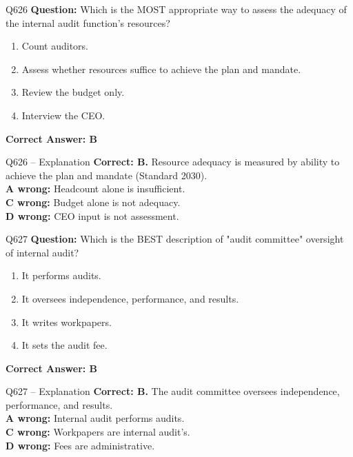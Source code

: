 \documentclass[aspectratio=169,10pt]{beamer}
\begin{document}
	\begin{frame}[t]{Q626}
		\small
		\textbf{Question:} Which is the MOST appropriate way to assess the adequacy of the internal audit function's resources?
		\begin{enumerate}[label=\Alph*.,itemsep=1pt,topsep=2pt]
			\item Count auditors.
			\item Assess whether resources suffice to achieve the plan and mandate.
			\item Review the budget only.
			\item Interview the CEO.
		\end{enumerate}
		\vspace{4pt}
		\textbf{Correct Answer: B}
	\end{frame}
	
	\begin{frame}[t]{Q626 -- Explanation}
		\small
		\textbf{Correct: B.} Resource adequacy is measured by ability to achieve the plan and mandate (Standard 2030). \\[4pt]
		\textbf{A wrong:} Headcount alone is insufficient. \\[2pt]
		\textbf{C wrong:} Budget alone is not adequacy. \\[2pt]
		\textbf{D wrong:} CEO input is not assessment.
	\end{frame}
	
	\begin{frame}[t]{Q627}
		\small
		\textbf{Question:} Which is the BEST description of "audit committee" oversight of internal audit?
		\begin{enumerate}[label=\Alph*.,itemsep=1pt,topsep=2pt]
			\item It performs audits.
			\item It oversees independence, performance, and results.
			\item It writes workpapers.
			\item It sets the audit fee.
		\end{enumerate}
		\vspace{4pt}
		\textbf{Correct Answer: B}
	\end{frame}
	
	\begin{frame}[t]{Q627 -- Explanation}
		\small
		\textbf{Correct: B.} The audit committee oversees independence, performance, and results. \\[4pt]
		\textbf{A wrong:} Internal audit performs audits. \\[2pt]
		\textbf{C wrong:} Workpapers are internal audit's. \\[2pt]
		\textbf{D wrong:} Fees are administrative.
	\end{frame}
	
\end{document}
